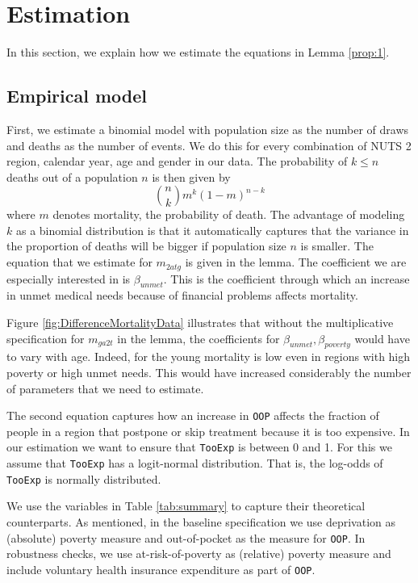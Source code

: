 \documentclass[a4paper,12pt]{article}
\begin{document}
\section{Estimation}
\label{sec:org460f525}
\label{sec:estimation}

In this section, we explain how we estimate the equations in Lemma \ref{prop:1}.

\subsection{Empirical model}
\label{sec:org77235a2}

First, we estimate a binomial model with population size as the number of draws and deaths as the number of events. We do this for every combination of NUTS 2 region, calendar year, age and gender in our data. The probability of \(k \leq n\) deaths out of a population \(n\) is then given by
\begin{equation}
\label{eq:binomial}
\binom{n}{k} m^{k}(1-m)^{n-k}
\end{equation}
where \(m\) denotes mortality, the probability of death. The advantage of modeling \(k\) as a binomial distribution is that it automatically captures that the variance in the proportion of deaths will be bigger if population size \(n\) is smaller. The equation that we estimate for \(m_{2atg}\) is given in the lemma. The coefficient we are especially interested in is \(\beta_{unmet}\). This is the coefficient through which an increase in unmet medical needs because of financial problems affects mortality.

Figure \ref{fig:DifferenceMortalityData} illustrates that without the multiplicative specification for \(m_{ga2t}\) in the lemma, the coefficients for \(\beta_{unmet}, \beta_{poverty}\) would have to vary with age. Indeed, for the young mortality is low even in regions with high poverty or high unmet needs. This would have increased considerably the number of parameters that we need to estimate. 

The second equation captures how an increase in \texttt{OOP} affects the fraction of people in a region that postpone or skip treatment because it is too expensive. In our estimation we want to ensure that \texttt{TooExp} is between 0 and 1. For this we assume that \texttt{TooExp} has a logit-normal distribution. That is, the log-odds of \texttt{TooExp} is normally distributed.

We use the variables in Table \ref{tab:summary} to capture their theoretical counterparts. As mentioned, in the baseline specification we use deprivation as (absolute) poverty measure and out-of-pocket as the measure for \texttt{OOP}. In robustness checks, we use at-risk-of-poverty as (relative) poverty measure and include voluntary health insurance expenditure as part of \texttt{OOP}.
\end{document}

